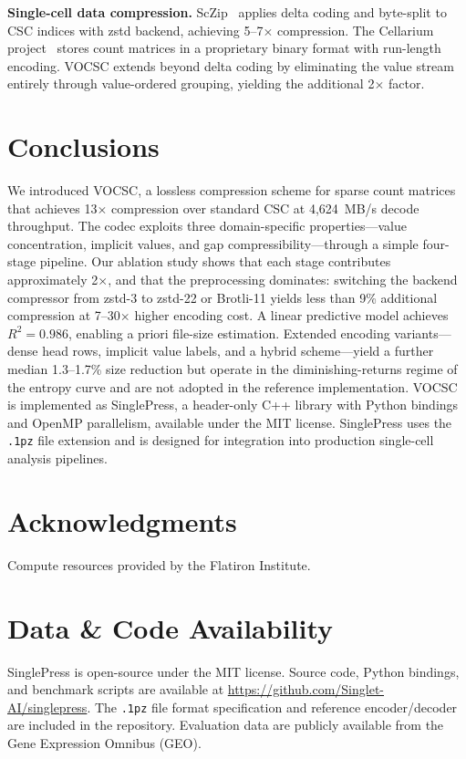\documentclass[10pt,twocolumn,letterpaper]{article}
\begin{document}
\textbf{Single-cell data compression.}
ScZip~\cite{li2024sczip} applies delta coding and byte-split to CSC indices with zstd backend, achieving 5--7$\times$ compression.
The Cellarium project~\cite{cellarium2024} stores count matrices in a proprietary binary format with run-length encoding.
VOCSC extends beyond delta coding by eliminating the value stream entirely through value-ordered grouping, yielding the additional 2$\times$ factor.

\section{Conclusions}

We introduced VOCSC, a lossless compression scheme for sparse count matrices that achieves 13$\times$ compression over standard CSC at 4,624~MB/s decode throughput.
The codec exploits three domain-specific properties---value concentration, implicit values, and gap compressibility---through a simple four-stage pipeline.
Our ablation study shows that each stage contributes approximately 2$\times$, and that the preprocessing dominates: switching the backend compressor from zstd-3 to zstd-22 or Brotli-11 yields less than 9\% additional compression at 7--30$\times$ higher encoding cost.
A linear predictive model achieves $R^2 = 0.986$, enabling a priori file-size estimation.
Extended encoding variants---dense head rows, implicit value labels, and a hybrid scheme---yield a further median 1.3--1.7\% size reduction but operate in the diminishing-returns regime of the entropy curve and are not adopted in the reference implementation.
VOCSC is implemented as SinglePress, a header-only C++ library with Python bindings and OpenMP parallelism, available under the MIT license.
SinglePress uses the \texttt{.1pz} file extension and is designed for integration into production single-cell analysis pipelines.

\section*{Acknowledgments}
Compute resources provided by the Flatiron Institute.

\section*{Data \& Code Availability}
SinglePress is open-source under the MIT license.
Source code, Python bindings, and benchmark scripts are available at \url{https://github.com/Singlet-AI/singlepress}.
The \texttt{.1pz} file format specification and reference encoder/decoder are included in the repository.
Evaluation data are publicly available from the Gene Expression Omnibus (GEO).


\end{document}
